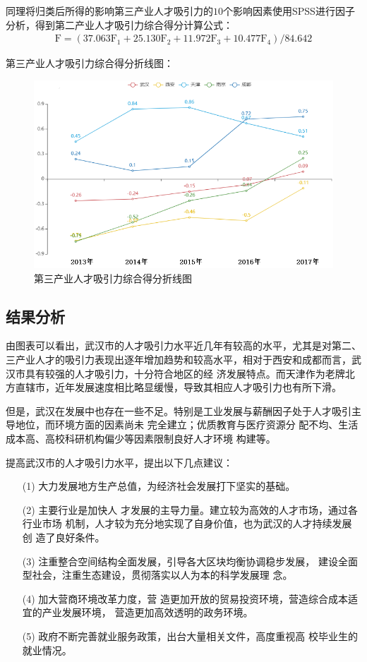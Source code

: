 \documentclass{whutmod}
\begin{document}
	同理将归类后所得的影响第三产业人才吸引力的$10$个影响因素使用SPSS进行因子分析，得到第二产业人才吸引力综合得分计算公式：
	\begin{gather}
	\mathrm { F } = \left( 37.063 \mathrm { F } _ { 1 } + 25.130 \mathrm { F } _ { 2 } + 11.972 \mathrm { F } _ { 3 } + 10.477 \mathrm { F } _ { 4 } \right) / 84.642
	\end{gather}

	第三产业人才吸引力综合得分折线图：
		\begin{figure}[H]
		\centering
		\includegraphics[width=\textwidth]{figures/33.png}
		\caption{第三产业人才吸引力综合得分折线图}\label{33}
	\end{figure}


	\subsection{结果分析}
	由图表可以看出，武汉市的人才吸引力水平近几年有较高的水平，尤其是对第二、三产业人才的吸引力表现出逐年增加趋势和较高水平，相对于西安和成都而言，武汉市具有较强的人才吸引力，十分符合地区的经
	济发展特点。而天津作为老牌北方直辖市，近年发展速度相比略显缓慢，导致其相应人才吸引力也有所下滑。
	
	但是，武汉在发展中也存在一些不足。特别是工业发展与薪酬因子处于人才吸引主导地位，而环境方面的因素尚未
	完全建立；优质教育与医疗资源分
	配不均、生活成本高、高校科研机构偏少等因素限制良好人才环境
	构建等。
	
	提高武汉市的人才吸引力水平，提出以下几点建议：
\begin{itemize}
	\item [(1)] 大力发展地方生产总值，为经济社会发展打下坚实的基础。
	\item [(2)]主要行业是加快人
	才发展的主导力量。建立较为高效的人才市场，通过各行业市场
	机制，人才较为充分地实现了自身价值，也为武汉的人才持续发展创
	造了良好条件。
	\item [(3)]注重整合空间结构全面发展，引导各大区块均衡协调稳步发展，
	建设全面型社会，注重生态建设，贯彻落实以人为本的科学发展理
	念。
	\item [(4)]加大营商环境改革力度，营
	造更加开放的贸易投资环境，营造综合成本适宜的产业发展环境，
	营造更加高效透明的政务环境。
	\item [(5)]政府不断完善就业服务政策，出台大量相关文件，高度重视高
	校毕业生的就业情况。
\end{itemize}
\end{document}
